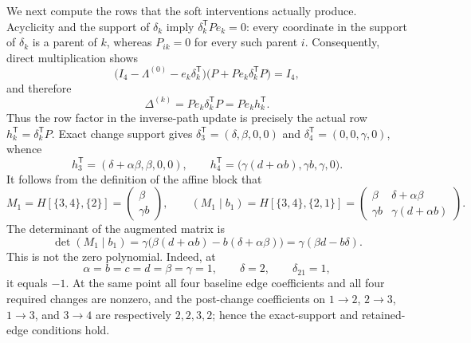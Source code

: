We next compute the rows that the soft interventions actually produce.  Acyclicity and the support of \(\delta_k\) imply \(\delta_k^{\mathsf T}Pe_k=0\): every coordinate in the support of \(\delta_k\) is a parent of \(k\), whereas \(P_{ik}=0\) for every such parent \(i\).  Consequently, direct multiplication shows
\[
\bigl(I_4-\Lambda^{(0)}-e_k\delta_k^{\mathsf T}\bigr)
\bigl(P+Pe_k\delta_k^{\mathsf T}P\bigr)=I_4,
\]
and therefore
\[
\Delta^{(k)}=Pe_k\delta_k^{\mathsf T}P=Pe_kh_k^{\mathsf T}.
\]
Thus the row factor in the inverse-path update is precisely the actual row \(h_k^{\mathsf T}=\delta_k^{\mathsf T}P\).  Exact change support gives \(\delta_3^{\mathsf T}=(\delta,\beta,0,0)\) and \(\delta_4^{\mathsf T}=(0,0,\gamma,0)\), whence
\[
h_3^{\mathsf T}=(\delta+\alpha\beta,\beta,0,0),
\qquad
h_4^{\mathsf T}=\bigl(\gamma(d+\alpha b),\gamma b,\gamma,0\bigr).
\]
It follows from the definition of the affine block that
\[
M_1=H[\{3,4\},\{2\}]
=\begin{pmatrix}\beta\\\gamma b\end{pmatrix},
\qquad
(M_1\mid b_1)=H[\{3,4\},\{2,1\}]
=\begin{pmatrix}
\beta&\delta+\alpha\beta\\
\gamma b&\gamma(d+\alpha b)
\end{pmatrix}.
\]
The determinant of the augmented matrix is
\[
\det(M_1\mid b_1)
=\gamma\bigl(\beta(d+\alpha b)-b(\delta+\alpha\beta)\bigr)
=\gamma(\beta d-b\delta).
\]
This is not the zero polynomial.  Indeed, at
\[
\alpha=b=c=d=\beta=\gamma=1,
\qquad \delta=2,
\qquad \delta_{21}=1,
\]
it equals \(-1\).  At the same point all four baseline edge coefficients and all four required changes are nonzero, and the post-change coefficients on \(1\to2\), \(2\to3\), \(1\to3\), and \(3\to4\) are respectively \(2,2,3,2\); hence the exact-support and retained-edge conditions hold.

